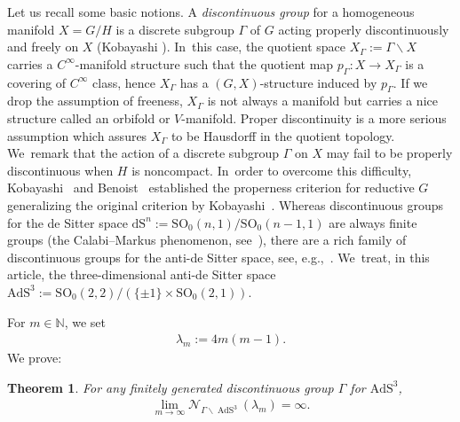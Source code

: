 \documentclass[10pt,a4paper]{amsart}
\numberwithin{equation}{section}
\newtheorem{Theorem}{Theorem}[section]
\begin{document}
Let us recall some basic notions.
A \textit{discontinuous group} for a homogeneous manifold \mbox{$X\!=\!G/H$}
is a discrete subgroup $\Gamma$ of $G$ acting properly discontinuously
and freely on $X$ (Kobayashi \cite[Definition~1.3]{Ko01}). In~this case, the quotient space $X_{\Gamma}:=\Gamma\backslash X$ carries a
$C^{\infty}$-manifold structure such that
the quotient map $p_{\Gamma}\colon X\rightarrow X_{\Gamma}$ is a covering of
$C^{\infty}$ class, hence $X_{\Gamma}$ has a $(G,X)$-structure induced by $p_{\Gamma}$.
If we drop the assumption of freeness, $X_{\Gamma}$ is not always a manifold but
carries a nice structure called an orbifold or $V$-manifold.
Proper discontinuity is a more
serious assumption which assures $X_{\Gamma}$ to be Hausdorff in the quotient topology. We~remark that the action of a discrete subgroup $\Gamma$ on $X$
may fail to be properly discontinuous
when $H$ is noncompact. In~order to overcome this difficulty,
Kobayashi~\cite{Kob96} and Benoist~\cite{Ben96} established the properness criterion
for reductive $G$ generalizing the original criterion by Kobayashi~\cite{Kob89}.
Whereas discontinuous groups for the de Sitter space
$\mathrm{dS}^{n}:=\mathrm{SO}_{0}(n,1)/\mathrm{SO}_{0}(n-1,1)$
are always finite groups
(the Calabi--Markus phenomenon, see~\cite{CaMa62, Kob89}),
there are a rich family of discontinuous groups for
the anti-de Sitter space, see, e.g.,~\cite{Go85, Kob98, Sa00}. We~treat, in this article, the three-dimensional anti-de Sitter space
$\mathrm{AdS}^{3}:=\mathrm{SO}_{0}(2,2)/(\{\pm1\}\times\mathrm{SO}_{0}(2,1))$.

For $m\in \mathbb{N}$, we set
\begin{gather*}%
\lambda_{m} := 4m(m-1).
\end{gather*}
We prove:
\begin{Theorem}
\label{mthm1}
For any finitely generated discontinuous group $\Gamma$ for
$\mathrm{AdS}^{3}$,
\begin{gather*}\lim_{m \to \infty}\mathcal{N}_{\Gamma\backslash\operatorname{AdS}^{3}}
(\lambda_{m}) = \infty.
\end{gather*}
\end{Theorem}
\end{document}
